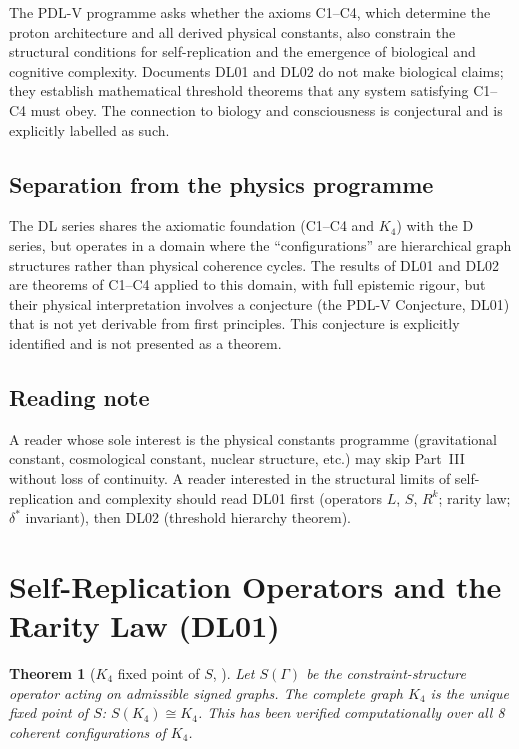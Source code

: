 \documentclass[11pt,a4paper]{article}
\theoremstyle{plain}
\newtheorem{theorem}{Theorem}[section]
\theoremstyle{definition}
\theoremstyle{remark}
\begin{document}
The PDL-V programme asks whether the axioms C1--C4, which determine the proton architecture and all derived physical constants, also constrain the structural conditions for self-replication and the emergence of biological and cognitive complexity. Documents DL01 and DL02 do not make biological claims; they establish mathematical threshold theorems that any system satisfying C1--C4 must obey. The connection to biology and consciousness is conjectural and is explicitly labelled as such.

\subsection{Separation from the physics programme}

The DL series shares the axiomatic foundation (C1--C4 and $K_4$) with the D series, but operates in a domain where the ``configurations'' are hierarchical graph structures rather than physical coherence cycles. The results of DL01 and DL02 are theorems of C1--C4 applied to this domain, with full epistemic rigour, but their physical interpretation involves a conjecture (the PDL-V Conjecture, DL01) that is not yet derivable from first principles. This conjecture is explicitly identified and is not presented as a theorem.

\subsection{Reading note}

A reader whose sole interest is the physical constants programme (gravitational constant, cosmological constant, nuclear structure, etc.) may skip Part~III without loss of continuity. A reader interested in the structural limits of self-replication and complexity should read DL01 first (operators $L$, $S$, $R^k$; rarity law; $\delta^*$ invariant), then DL02 (threshold hierarchy theorem).

\section{Self-Replication Operators and the Rarity Law (DL01)}
\label{sec:DL01}

\begin{theorem}[$K_4$ fixed point of $S$, \cite{DL01}]
\label{thm:DL01_fixedpoint}
Let $S(\Gamma)$ be the constraint-structure operator acting on admissible signed graphs. The complete graph $K_4$ is the unique fixed point of $S$: $S(K_4) \cong K_4$. This has been verified computationally over all 8 coherent configurations of $K_4$.
\end{theorem}
\end{document}
